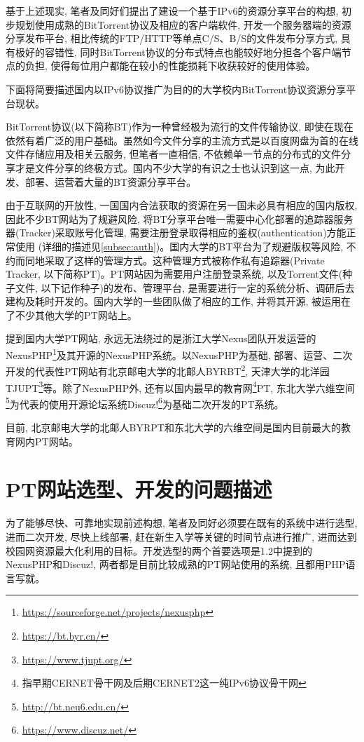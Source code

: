 基于上述现实, 笔者及同好们提出了建设一个基于IPv6的资源分享平台的构想, 初步规划使用成熟的BitTorrent协议及相应的客户端软件, 开发一个服务器端的资源分享发布平台, 相比传统的FTP/HTTP等单点C/S、B/S的文件发布分享方式, 具有极好的容错性, 同时BitTorrent协议的分布式特点也能较好地分担各个客户端节点的负担, 使得每位用户都能在较小的性能损耗下收获较好的使用体验。

下面将简要描述国内以IPv6协议推广为目的的大学校内BitTorrent协议资源分享平台现状。

BitTorrent协议\cite{cohen2003incentives}\cite{bramcohen2008bep0003}(以下简称BT)作为一种曾经极为流行的文件传输协议, 即使在现在依然有着广泛的用户基础。虽然如今文件分享的主流方式是以百度网盘为首的在线文件存储应用及相关云服务, 但笔者一直相信, 不依赖单一节点的分布式的文件分享才是文件分享的终极方式。国内不少大学的有识之士也认识到这一点, 为此开发、部署、运营着大量的BT资源分享平台。

由于互联网的开放性, 一国国内合法获取的资源在另一国未必具有相应的国内版权, 因此不少BT网站为了规避风险, 将BT分享平台唯一需要中心化部署的追踪器服务器(Tracker)采取账号化管理, 需要注册登录取得相应的鉴权(authentication)方能正常使用 (详细的描述见\ref{subsec:auth})。国内大学的BT平台为了规避版权等风险, 不约而同地采取了这样的管理方式。这种管理方式被称作私有追踪器(Private Tracker, 以下简称PT)。PT网站因为需要用户注册登录系统, 以及Torrent文件(种子文件, 以下记作种子)的发布、管理平台, 是需要进行一定的系统分析、调研后去建构及耗时开发的。国内大学的一些团队做了相应的工作, 并将其开源, 被运用在了不少其他大学的PT网站上。

提到国内大学PT网站, 永远无法绕过的是浙江大学Nexus团队开发运营的NexusPHP\footnote{\url{https://sourceforge.net/projects/nexusphp}}及其开源的NexusPHP系统。以NexusPHP为基础, 部署、运营、二次开发的代表性PT网站有北京邮电大学的北邮人BYRBT\footnote{\url{https://bt.byr.cn/}}, 天津大学的北洋园TJUPT\footnote{\url{https://www.tjupt.org/}}等。除了NexusPHP外, 还有以国内最早的教育网\footnote{指早期CERNET骨干网及后期CERNET2这一纯IPv6协议骨干网}PT, 东北大学六维空间\footnote{\url{http://bt.neu6.edu.cn/}}为代表的使用开源论坛系统Discuz!\footnote{\url{https://www.discuz.net/}}为基础二次开发的PT系统。

目前, 北京邮电大学的北邮人BYRPT和东北大学的六维空间是国内目前最大的教育网内PT网站。

\section{PT网站选型、开发的问题描述}
\label{sec:related_work}
为了能够尽快、可靠地实现前述构想, 笔者及同好必须要在既有的系统中进行选型, 进而二次开发, 尽快上线部署, 赶在新生入学等关键的时间节点进行推广, 进而达到校园网资源最大化利用的目标。开发选型的两个首要选项是1.2中提到的NexusPHP和Discuz!, 两者都是目前比较成熟的PT网站使用的系统, 且都用PHP语言写就。

